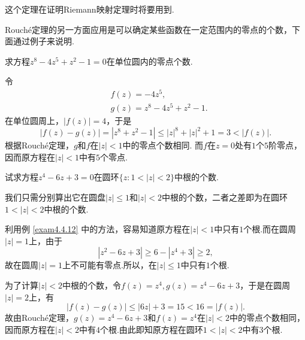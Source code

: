这个定理在证明Riemann映射定理时将要用到.

Rouch\'e定理的另一方面应用是可以确定某些函数在一定范围内的零点的个数，下面通过例子来说明.
\begin{example}\label{exam4.4.12}
求方程$z^8-4z^5+z^2-1=0$在单位圆内的零点个数.
\end{example}
\begin{solution}
令
\begin{align*}
&f(z)=-4z^5,\\
&g(z)=z^8-4z^5+z^2-1.
\end{align*}
在单位圆周上，$|f(z)|=4$，于是
\[
  |f(z)-g(z)|=|z^8+z^2-1|\le|z|^8+|z|^2+1=3<|f(z)|.
\]
根据Rouch\'e定理，$g$和$f$在$|z|<1$中的零点个数相同. 而$f$在$z=0$处有$1$个$5$阶零点，因而原方程在$|z|<1$中有$5$个零点.
\end{solution}


\begin{example}\label{exam4.4.13}
试求方程$z^4-6z+3=0$在圆环$\{z:1<|z|<2\}$中根的个数.
\end{example}
\begin{solution}
我们只需分别算出它在圆盘$|z|\le1$和$|z|<2$中根的个数，二者之差即为在圆环$1<|z|<2$中根的个数.

利用例 \ref{exam4.4.12} 中的方法，容易知道原方程在$|z|<1$中只有$1$个根.而在圆周$|z|=1$上，由于
\[|z^2-6z+3|\ge 6-|z^4+3|\ge2,\]
故在圆周$|z|=1$上不可能有零点.所以，在$|z|\le1$中只有$1$个根.

为了计算$|z|<2$中根的个数，令$f(z)=z^4,g(z)=z^4-6z+3$，于是在圆周$|z|=2$上，有
\[|f(z)-g(z)|\le|6z|+3=15<16=|f(z)|.\]
故由Rouch\'e定理，$g(z)=z^4-6z+3$和$f(z)=z^4$在$|z|<2$中的零点个数相同，因而原方程在$|z|<2$中有$4$个根.由此即知原方程在圆环$1<|z|<2$中有$3$个根.
\end{solution}

